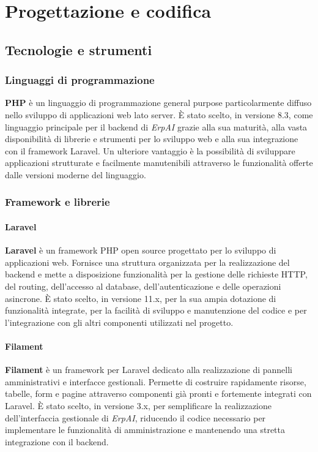 \chapter{Progettazione e codifica}
\label{chap:progettazione-codifica}


\section{Tecnologie e strumenti}
\label{sec:tecnologie-strumenti}


\subsection{Linguaggi di programmazione}
\textbf{PHP} è un linguaggio di programmazione general purpose particolarmente diffuso nello sviluppo di applicazioni web lato server. È stato scelto, in versione 8.3, come linguaggio 
principale per il backend di \textit{ErpAI} grazie alla sua maturità, alla vasta disponibilità di librerie e strumenti per lo sviluppo web e alla sua integrazione con il framework 
Laravel. Un ulteriore vantaggio è la possibilità di sviluppare applicazioni strutturate e facilmente manutenibili attraverso le funzionalità offerte dalle versioni moderne 
del linguaggio.


\subsection{Framework e librerie}
\subsubsection{Laravel}
\textbf{Laravel} è un framework PHP open source progettato per lo sviluppo di applicazioni web. Fornisce una struttura organizzata per la realizzazione del backend e 
mette a disposizione funzionalità per la gestione delle richieste HTTP, del routing, dell'accesso al database, dell'autenticazione e delle operazioni asincrone. 
È stato scelto, in versione 11.x, per la sua ampia dotazione di funzionalità integrate, per la facilità di sviluppo e manutenzione del codice e per l'integrazione con gli altri componenti 
utilizzati nel progetto.

\subsubsection{Filament}
\textbf{Filament} è un framework per Laravel dedicato alla realizzazione di pannelli amministrativi e interfacce gestionali. Permette di costruire rapidamente risorse, tabelle, 
form e pagine attraverso componenti già pronti e fortemente integrati con Laravel. È stato scelto, in versione 3.x, per semplificare la realizzazione dell'interfaccia gestionale di \textit{ErpAI}, 
riducendo il codice necessario per implementare le funzionalità di amministrazione e mantenendo una stretta integrazione con il backend.

